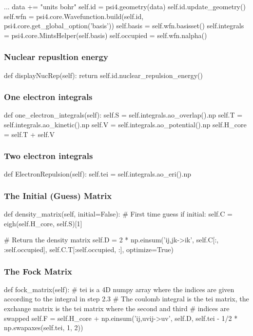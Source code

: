 \documentclass{beamer}
\begin{document}
\begin{frame}[fragile]
    \begin{python}
        ...
            data += "units bohr"
            self.id = psi4.geometry(data)
        self.id.update_geometry()
        self.wfn =  psi4.core.Wavefunction.build(self.id, psi4.core.get_global_option('basis'))
        self.basis = self.wfn.basisset()
        self.integrals = psi4.core.MintsHelper(self.basis)
        self.occupied = self.wfn.nalpha() 
    \end{python}  
\end{frame}


\begin{frame}[fragile]
    \frametitle{Nuclear repusltion energy}
    \begin{python}
def displayNucRep(self):
    return self.id.nuclear_repulsion_energy()
    \end{python}
\end{frame}

\begin{frame}[fragile]
    \frametitle{One electron integrals}
    \begin{python}
def one_electron_integrals(self):
    self.S = self.integrals.ao_overlap().np
    self.T = self.integrals.ao_kinetic().np
    self.V = self.integrals.ao_potential().np
    self.H_core = self.T + self.V 
    \end{python}
\end{frame}

\begin{frame}[fragile]
    \frametitle{Two electron integrals}
    \begin{python}
def ElectronRepulsion(self):
    self.tei = self.integrals.ao_eri().np
    \end{python}
\end{frame}

\begin{frame}[fragile]
    \frametitle{The Initial (Guess) Matrix}
    \begin{python}
def density_matrix(self, initial=False):  
    # First time guess
    if initial:        
        self.C = eigh(self.H_core, self.S)[1]
    
    # Return the density matrix
    self.D = 2 * np.einsum('ij,jk->ik', self.C[:, :self.occupied], self.C.T[:self.occupied, :], optimize=True)
    \end{python}
\end{frame}

\begin{frame}[fragile]
    \frametitle{The Fock Matrix}
    \begin{python}
def fock_matrix(self):
    # tei is a 4D numpy array where the indices are given according to the integral in step 2.3
    # The coulomb integral is the tei matrix, the exchange matrix is the tei matrix where the second and third
    # indices are swapped
    self.F =  self.H_core + np.einsum('ij,uvij->uv', self.D, self.tei - 1/2 * np.swapaxes(self.tei, 1, 2))
    \end{python}
\end{frame}
\end{document}

